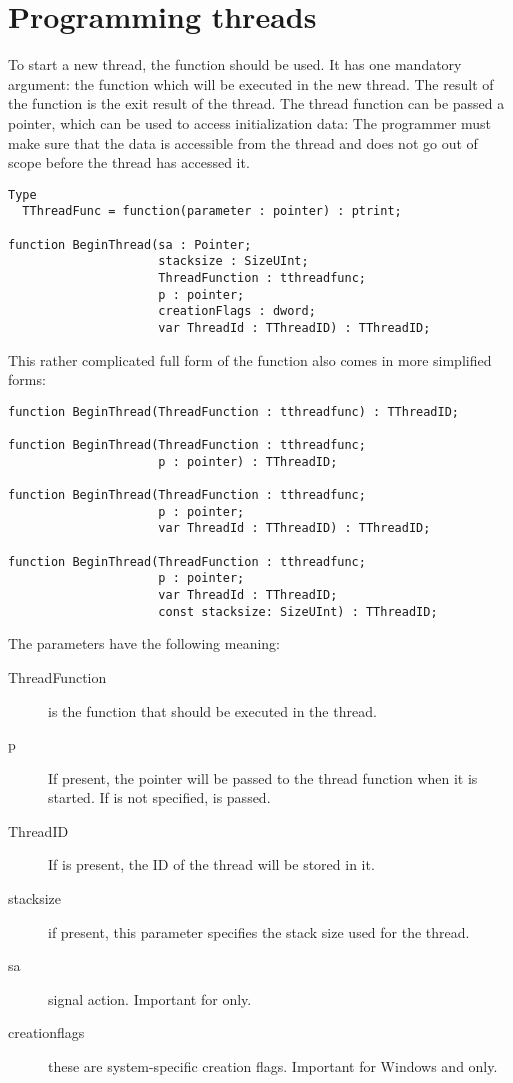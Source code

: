 \section{Programming threads}
To start a new thread, the  function should be used. It has one 
mandatory argument: the function which will be executed in the new thread. The result
of the function is the exit result of the thread. The thread function can be passed a 
pointer, which can be used to access initialization data: The programmer must make sure 
that the data is accessible from the thread and does not go out of scope before the 
thread has accessed it.
\begin{verbatim}
Type
  TThreadFunc = function(parameter : pointer) : ptrint;

function BeginThread(sa : Pointer;
                     stacksize : SizeUInt;
                     ThreadFunction : tthreadfunc;
                     p : pointer;
                     creationFlags : dword;
                     var ThreadId : TThreadID) : TThreadID;
\end{verbatim}
This rather complicated full form of the function also comes in more simplified
forms:
\begin{verbatim}
function BeginThread(ThreadFunction : tthreadfunc) : TThreadID;

function BeginThread(ThreadFunction : tthreadfunc;
                     p : pointer) : TThreadID;

function BeginThread(ThreadFunction : tthreadfunc;
                     p : pointer; 
                     var ThreadId : TThreadID) : TThreadID;

function BeginThread(ThreadFunction : tthreadfunc;
                     p : pointer;
                     var ThreadId : TThreadID; 
                     const stacksize: SizeUInt) : TThreadID;
\end{verbatim}
The parameters have the following meaning:
\begin{description}
\item[ThreadFunction] is the function that should be executed in the thread.
\item[p] If present, the pointer  will be passed to the thread function 
when it is started. If  is not specified,  is passed. 
\item[ThreadID] If  is present, the ID of the thread will be stored in it. 
\item[stacksize] if present, this parameter specifies the stack size used for the thread.
\item[sa] signal action. Important for \linux only.
\item[creationflags] these are system-specific creation flags. Important for
Windows and \ostwo only.
\end{description}

